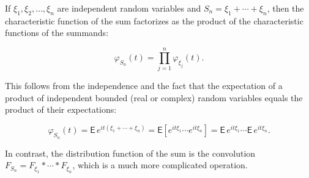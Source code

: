 If $\xi_1, \xi_2, \ldots, \xi_n$ are independent random variables and $S_n = \xi_1 + \cdots + \xi_n$, then the characteristic function of the sum factorizes as the product of the characteristic functions of the summands:

$$\varphi_{S_n}(t) = \prod_{j=1}^{n} \varphi_{\xi_j}(t).$$

This follows from the independence and the fact that the expectation of a product of independent bounded (real or complex) random variables equals the product of their expectations:

$$\varphi_{S_n}(t) = \mathsf{E}\, e^{it(\xi_1 + \cdots + \xi_n)} = \mathsf{E}\!\left[e^{it\xi_1} \cdots e^{it\xi_n}\right] = \mathsf{E}\, e^{it\xi_1} \cdots \mathsf{E}\, e^{it\xi_n}.$$

In contrast, the distribution function of the sum is the convolution $F_{S_n} = F_{\xi_1} \ast \cdots \ast F_{\xi_n}$, which is a much more complicated operation.
